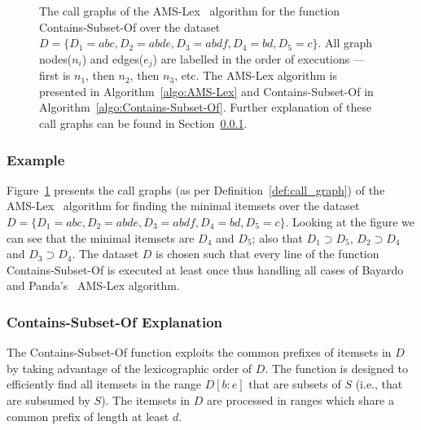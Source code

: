 \documentclass[13pt,a4paper]{article}
\begin{document}
\begin{figure} [t]
	\centering
	\caption{ The call graphs of the AMS-Lex~\cite{BayardoPanda11} algorithm for the function Contains-Subset-Of over the dataset $D = \{ D_1 = abc, D_2 = abde, D_3 = abdf, D_4 = bd, D_5 = c \}$. All graph nodes($n_i$) and edges($e_j$) are labelled in the order of executions --- first is $n_1$, then $n_2$, then $n_3$, etc. The AMS-Lex algorithm is presented in Algorithm~\ref{algo:AMS-Lex} and Contains-Subset-Of in Algorithm~\ref{algo:Contains-Subset-Of}. Further explanation of these call graphs can be found in Section~\ref{sec:background:ams-lex:example}.}
	\label{fig:algo:ams-lex:example}
\end{figure}

\subsubsection{Example}
\label{sec:background:ams-lex:example}

Figure~\ref{fig:algo:ams-lex:example} presents the call graphs (as per Definition~\ref{def:call_graph}) of the AMS-Lex~\cite{BayardoPanda11} algorithm for finding the minimal itemsets over the dataset $D = \{ D_1 = abc, D_2 = abde, D_3 = abdf, D_4 = bd, D_5 = c \}$. Looking at the figure we can see that the minimal itemsets are $D_4$ and $D_5$; also that $D_1 \supset D_5$, $D_2 \supset D_4$ and $D_3 \supset D_4$. The dataset $D$ is chosen such that every line of the function Contains-Subset-Of is executed at least once thus handling all cases of Bayardo and Panda's~\cite{BayardoPanda11} AMS-Lex algorithm. 

\subsubsection{Contains-Subset-Of Explanation}
The Contains-Subset-Of function exploits the common prefixes of itemsets in $D$ by taking advantage of the lexicographic order of $D$. 
The function is designed to efficiently find all itemsets in the range $D[b:e]$ that are subsets of $S$ (i.e., that are subsumed by $S$).
The itemsets in $D$ are processed in ranges which share a common prefix of length at least $d$.
\end{document}
